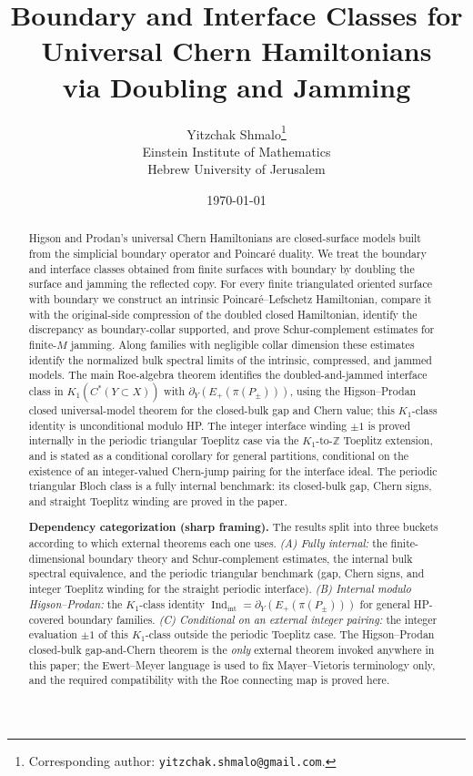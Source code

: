 \documentclass[11pt]{article}
\title{Boundary and Interface Classes for Universal Chern Hamiltonians\\
via Doubling and Jamming}
\author{
Yitzchak Shmalo\thanks{Corresponding author: \texttt{yitzchak.shmalo@gmail.com}.}\\[0.6em]
Einstein Institute of Mathematics\\
Hebrew University of Jerusalem
}
\date{\today}
\numberwithin{equation}{section}
\theoremstyle{definition}
\theoremstyle{remark}
\newcommand{\Indint}{\operatorname{Ind}_{\mathrm{int}}}
\begin{document}
\maketitle

\begin{abstract}
Higson and Prodan's universal Chern Hamiltonians are closed-surface models built from the
simplicial boundary operator and Poincar\'e duality. We treat the boundary and interface classes
obtained from finite surfaces with boundary by doubling the surface and jamming the reflected copy.
For every finite triangulated oriented surface with boundary we construct an intrinsic
Poincar\'e--Lefschetz Hamiltonian, compare it with the original-side compression of the doubled
closed Hamiltonian, identify the discrepancy as boundary-collar supported, and prove
Schur-complement estimates for finite-\(M\) jamming. Along families with negligible collar
dimension these estimates identify the normalized bulk spectral limits of the intrinsic,
compressed, and jammed models. The main Roe-algebra theorem identifies the doubled-and-jammed
interface class in \(K_1(C^*(Y\subset X))\) with
\(\partial_Y(E_+(\pi(P_\pm)))\), using the Higson--Prodan closed universal-model theorem
\cite{HigsonProdanUniversalPRL,HigsonProdanUniversalArxiv} for the closed-bulk gap and Chern
value; this \(K_1\)-class identity is unconditional modulo HP. The integer interface winding
\(\pm1\) is proved internally in the periodic triangular Toeplitz case via the
\(K_1\)-to-\(\mathbb Z\) Toeplitz extension, and is stated as a conditional corollary for
general partitions, conditional on the existence of an integer-valued Chern-jump pairing for
the interface ideal. The periodic triangular Bloch class is a fully internal benchmark: its
closed-bulk gap, Chern signs, and straight Toeplitz winding are proved in the paper.

\medskip\noindent
\textbf{Dependency categorization (sharp framing).} The results split into three buckets
according to which external theorems each one uses. \emph{(A) Fully internal:} the
finite-dimensional boundary theory and Schur-complement estimates, the internal bulk spectral
equivalence, and the periodic triangular benchmark (gap, Chern signs, and integer Toeplitz
winding for the straight periodic interface). \emph{(B) Internal modulo Higson--Prodan:} the
\(K_1\)-class identity \(\Indint=\partial_Y(E_+(\pi(P_\pm)))\) for general HP-covered boundary
families. \emph{(C) Conditional on an external integer pairing:} the integer evaluation
\(\pm 1\) of this \(K_1\)-class outside the periodic Toeplitz case. The Higson--Prodan
closed-bulk gap-and-Chern theorem is the \emph{only} external theorem invoked anywhere in this
paper; the Ewert--Meyer language is used to fix Mayer--Vietoris terminology only, and the
required compatibility with the Roe connecting map is proved here.


\end{abstract}
\end{document}
